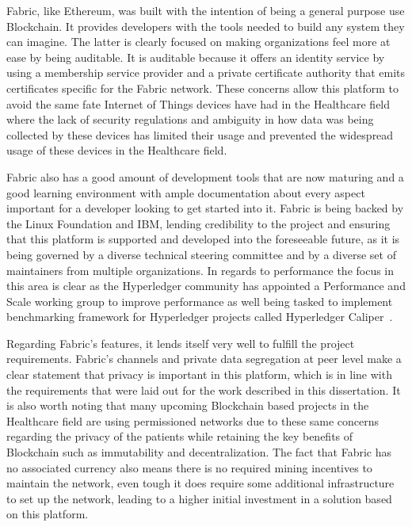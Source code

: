Fabric, like Ethereum, was built with the intention of being a general purpose
use Blockchain. It provides developers with the tools needed to build any
system they can imagine. The latter is clearly focused on making organizations
feel more at ease by being auditable. It is auditable because it offers an
identity service by using a membership service provider and a private
certificate authority that emits certificates specific for the Fabric network.
These concerns allow this platform to avoid the same fate Internet of Things
devices have had in the Healthcare field~\cite{Tana2017} where the lack of
security regulations and ambiguity in how data was being collected by these
devices has limited their usage and prevented the widespread usage of these
devices in the Healthcare field.

Fabric also has a good amount of development tools that are now maturing and a
good learning environment with ample documentation about every aspect important
for a developer looking to get started into it. Fabric is being backed by the
Linux Foundation and IBM, lending credibility to the project and ensuring that
this platform is supported and developed into the foreseeable future, as it is
being governed by a diverse technical steering committee and by a diverse set
of maintainers from multiple organizations. In regards to performance the focus
in this area is clear as the Hyperledger community has appointed a Performance
and Scale working group to improve performance as well being tasked to
implement benchmarking framework for Hyperledger projects called Hyperledger
Caliper~\cite{performanceScale2017}.

Regarding Fabric's features, it lends itself very well to fulfill the project
requirements. Fabric's channels and private data segregation at peer level make
a clear statement that privacy is important in this platform, which is in line
with the requirements that were laid out for the work described in this
dissertation. It is also worth noting that many upcoming Blockchain based
projects in the Healthcare field are using permissioned networks due to these
same concerns regarding the privacy of the patients while retaining the key
benefits of Blockchain such as immutability and decentralization. The fact that
Fabric has no associated currency also means there is no required mining
incentives to maintain the network, even tough it does require some additional
infrastructure to set up the network, leading to a higher initial investment in
a solution based on this platform.

